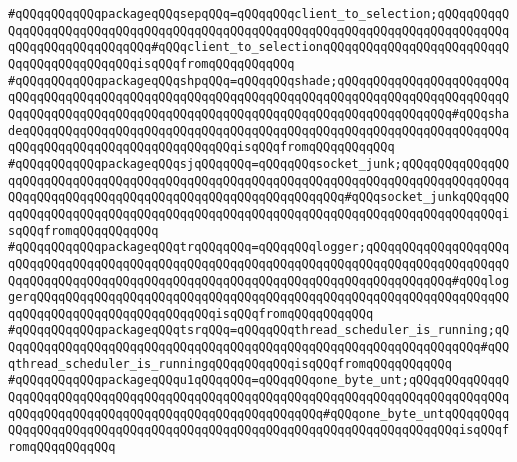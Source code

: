 \verb|#qQQqqQQqqQQqpackageqQQqsepqQQq=qQQqqQQqclient_to_selection;qQQqqQQqqQQqqQQqqQQqqQQqqQQqqQQqqQQqqQQqqQQqqQQqqQQqqQQqqQQqqQQqqQQqqQQqqQQqqQQqqQQqqQQqqQQqqQQqqQQq#qQQqclient_to_selectionqQQqqQQqqQQqqQQqqQQqqQQqqQQqqQQqqQQqqQQqqQQqisqQQqfromqQQqqQQqqQQq|\newline
\verb|#qQQqqQQqqQQqpackageqQQqshpqQQq=qQQqqQQqshade;qQQqqQQqqQQqqQQqqQQqqQQqqQQqqQQqqQQqqQQqqQQqqQQqqQQqqQQqqQQqqQQqqQQqqQQqqQQqqQQqqQQqqQQqqQQqqQQqqQQqqQQqqQQqqQQqqQQqqQQqqQQqqQQqqQQqqQQqqQQqqQQqqQQqqQQqqQQq#qQQqshadeqQQqqQQqqQQqqQQqqQQqqQQqqQQqqQQqqQQqqQQqqQQqqQQqqQQqqQQqqQQqqQQqqQQqqQQqqQQqqQQqqQQqqQQqqQQqqQQqqQQqisqQQqfromqQQqqQQqqQQq|\newline
\verb|#qQQqqQQqqQQqpackageqQQqsjqQQqqQQq=qQQqqQQqsocket_junk;qQQqqQQqqQQqqQQqqQQqqQQqqQQqqQQqqQQqqQQqqQQqqQQqqQQqqQQqqQQqqQQqqQQqqQQqqQQqqQQqqQQqqQQqqQQqqQQqqQQqqQQqqQQqqQQqqQQqqQQqqQQqqQQqqQQq#qQQqsocket_junkqQQqqQQqqQQqqQQqqQQqqQQqqQQqqQQqqQQqqQQqqQQqqQQqqQQqqQQqqQQqqQQqqQQqqQQqqQQqisqQQqfromqQQqqQQqqQQq|\newline
\verb|#qQQqqQQqqQQqpackageqQQqtrqQQqqQQq=qQQqqQQqlogger;qQQqqQQqqQQqqQQqqQQqqQQqqQQqqQQqqQQqqQQqqQQqqQQqqQQqqQQqqQQqqQQqqQQqqQQqqQQqqQQqqQQqqQQqqQQqqQQqqQQqqQQqqQQqqQQqqQQqqQQqqQQqqQQqqQQqqQQqqQQqqQQqqQQqqQQq#qQQqloggerqQQqqQQqqQQqqQQqqQQqqQQqqQQqqQQqqQQqqQQqqQQqqQQqqQQqqQQqqQQqqQQqqQQqqQQqqQQqqQQqqQQqqQQqqQQqqQQqisqQQqfromqQQqqQQqqQQq|\newline
\verb|#qQQqqQQqqQQqpackageqQQqtsrqQQq=qQQqqQQqthread_scheduler_is_running;qQQqqQQqqQQqqQQqqQQqqQQqqQQqqQQqqQQqqQQqqQQqqQQqqQQqqQQqqQQqqQQqqQQq#qQQqthread_scheduler_is_runningqQQqqQQqqQQqisqQQqfromqQQqqQQqqQQq|\newline
\verb|#qQQqqQQqqQQqpackageqQQqu1qQQqqQQq=qQQqqQQqone_byte_unt;qQQqqQQqqQQqqQQqqQQqqQQqqQQqqQQqqQQqqQQqqQQqqQQqqQQqqQQqqQQqqQQqqQQqqQQqqQQqqQQqqQQqqQQqqQQqqQQqqQQqqQQqqQQqqQQqqQQqqQQqqQQqqQQq#qQQqone_byte_untqQQqqQQqqQQqqQQqqQQqqQQqqQQqqQQqqQQqqQQqqQQqqQQqqQQqqQQqqQQqqQQqqQQqqQQqisqQQqfromqQQqqQQqqQQq|\newline
